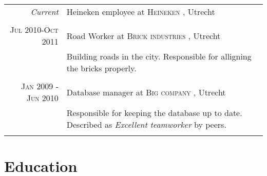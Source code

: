 \documentclass[a4paper,10pt]{article} %
\begin{document}
\begin{tabular}{r|p{11cm}}
\emph{Current} &              %
Heineken employee %
at \textsc{
Heineken %
}, 
Utrecht %
\\ \multicolumn{2}{c}{} \\



\textsc{
Jul 2010-Oct 2011 %
} & 
Road Worker %
 at \textsc{
Brick industries %
}, 
Utrecht  %
\emph{}\\
& \footnotesize{
Building roads in the city. Responsible for alligning the bricks properly. %
} \\
\multicolumn{2}{c}{} \\


\textsc{
Jan 2009 - Jun 2010 %
} & 
Database manager %
 at \textsc{
Big company %
}, 
Utrecht  %
\emph{}\\
& \footnotesize{
Responsible for keeping the database up to date. Described as \emph{Excellent teamworker} by peers. %
} \\
\multicolumn{2}{c}{} \\
\end{tabular}


\section{Education}
\end{document}
